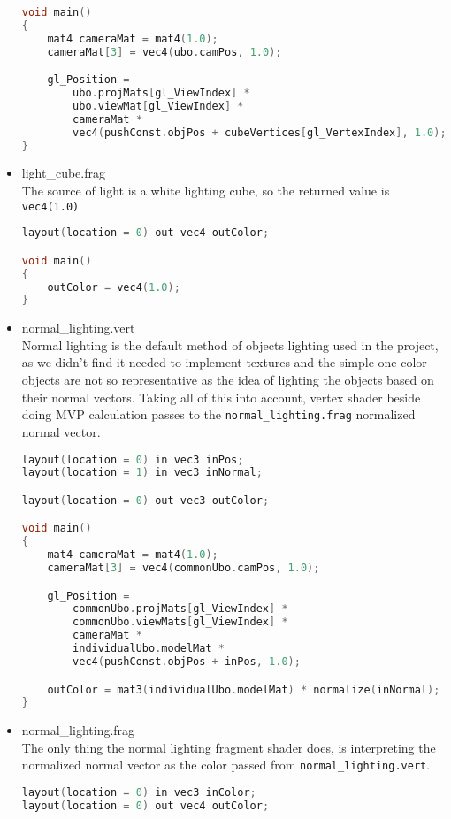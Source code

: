 \begin{itemize}
\begin{lstlisting}[language=c++, caption=Light cube vertex shader (./assets/shaders/light\_cube.vert)]
void main()
{
    mat4 cameraMat = mat4(1.0);
    cameraMat[3] = vec4(ubo.camPos, 1.0);

    gl_Position =
        ubo.projMats[gl_ViewIndex] *
        ubo.viewMat[gl_ViewIndex] *
        cameraMat *
        vec4(pushConst.objPos + cubeVertices[gl_VertexIndex], 1.0);
}
\end{lstlisting}
    \item light\_cube.frag\\
    The source of light is a white lighting cube, so the returned value is \texttt{vec4(1.0)}
\begin{lstlisting}[language=c++, caption=Light cube fragment shader (./assets/shaders/light\_cube.frag)]
layout(location = 0) out vec4 outColor;

void main()
{
    outColor = vec4(1.0);
}
\end{lstlisting}
    \item normal\_lighting.vert\\
    \label{vert_normal_light}
    Normal lighting is the default method of objects lighting used in the project, as we didn't find it needed to implement textures and the simple one-color objects are not so representative as the idea of lighting the objects based on their normal vectors. Taking all of this into account, vertex shader beside doing MVP calculation passes to the \texttt{normal\_lighting.frag} normalized normal vector.
\begin{lstlisting}[language=c++, caption=Normal lighting vertex shader (./assets/shaders/normal\_lighting.vert)]
layout(location = 0) in vec3 inPos;
layout(location = 1) in vec3 inNormal;

layout(location = 0) out vec3 outColor;

void main()
{
    mat4 cameraMat = mat4(1.0);
    cameraMat[3] = vec4(commonUbo.camPos, 1.0);

    gl_Position =
        commonUbo.projMats[gl_ViewIndex] *
        commonUbo.viewMats[gl_ViewIndex] *
        cameraMat *
        individualUbo.modelMat *
        vec4(pushConst.objPos + inPos, 1.0);

    outColor = mat3(individualUbo.modelMat) * normalize(inNormal);
}
\end{lstlisting}
    \item normal\_lighting.frag\\
    The only thing the normal lighting fragment shader does, is interpreting the normalized normal vector as the color passed from \texttt{normal\_lighting.vert}.
    \label{frag_normal_light}
\begin{lstlisting}[language=c++, caption=Normal lighting fragment shader (./assets/shaders/normal\_lighting.frag)]
layout(location = 0) in vec3 inColor;
layout(location = 0) out vec4 outColor;


\end{lstlisting}
\end{itemize}

